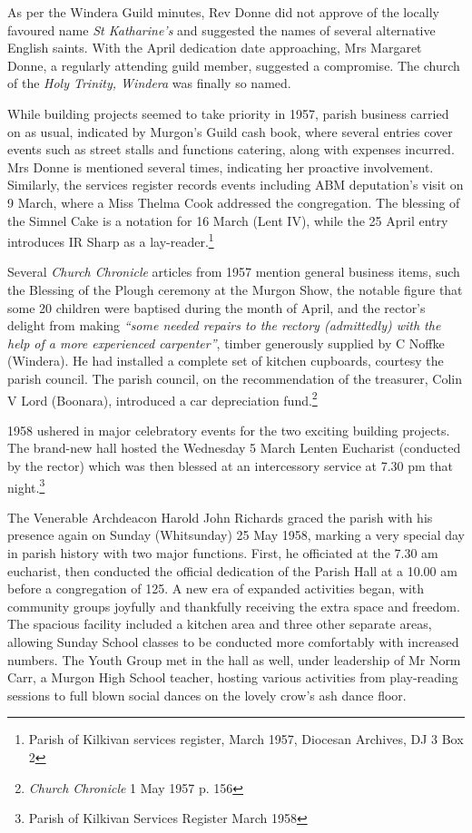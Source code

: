 As per the Windera Guild minutes, Rev Donne did not approve of the locally favoured name \emph{St Katharine's} and suggested the names of several alternative English saints. With the April dedication date approaching, Mrs Margaret Donne, a regularly attending guild member, suggested a compromise. The church of the \emph{Holy Trinity, Windera} was finally so named.



While building projects seemed to take priority in 1957, parish business carried on as usual, indicated by Murgon's Guild cash book, where several entries cover events such as street stalls and functions catering, along with expenses incurred. Mrs Donne is mentioned several times, indicating her proactive involvement. Similarly, the services register records events including ABM deputation's visit on 9 March, where a Miss Thelma Cook addressed the congregation. The blessing of the Simnel Cake is a notation for 16 March (Lent IV), while the 25 April entry introduces IR Sharp as a lay-reader.\footnote{Parish of Kilkivan services register, March 1957, Diocesan Archives, DJ 3 Box 2}


Several \emph{Church Chronicle} articles from 1957 mention general business items, such the Blessing of the Plough ceremony at the Murgon Show, the notable figure that some 20 children were baptised during the month of April, and the rector's delight from making \emph{``some needed repairs to the rectory (admittedly) with the help of a more experienced carpenter''}, timber generously supplied by C Noffke (Windera). He had installed a complete set of kitchen cupboards, courtesy the parish council. The parish council, on the recommendation of the treasurer, Colin V Lord (Boonara), introduced a car depreciation fund.\footnote{\emph{Church Chronicle} 1 May 1957 p. 156}


1958 ushered in major celebratory events for the two exciting building projects. The brand-new hall hosted the Wednesday 5 March Lenten Eucharist (conducted by the rector) which was then blessed at an intercessory service at 7.30 pm that night.\footnote{Parish of Kilkivan Services Register March 1958}


The Venerable Archdeacon Harold John Richards graced the parish with his presence again on Sunday (Whitsunday) 25 May 1958, marking a very special day in parish history with two major functions. First, he officiated at the 7.30 am eucharist, then conducted the official dedication of the Parish Hall at a 10.00 am before a congregation of 125. A new era of expanded activities began, with community groups joyfully and thankfully receiving the extra space and freedom. The spacious facility included a kitchen area and three other separate areas, allowing Sunday School classes to be conducted more comfortably with increased numbers. The Youth Group met in the hall as well, under leadership of Mr Norm Carr, a Murgon High School teacher, hosting various activities from play-reading sessions to full blown social dances on the lovely crow's ash dance floor.




